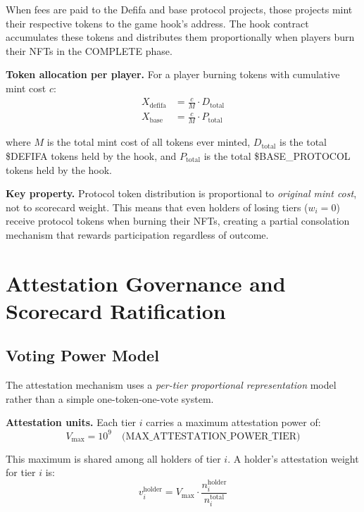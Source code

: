 \documentclass[11pt,a4paper]{article}
\begin{document}
When fees are paid to the Defifa and base protocol projects, those projects mint their respective tokens to the game hook's address. The hook contract accumulates these tokens and distributes them proportionally when players burn their NFTs in the COMPLETE phase.

\textbf{Token allocation per player.} For a player burning tokens with cumulative mint cost $c$:
\begin{align}
X_{\text{defifa}} &= \frac{c}{M} \cdot D_{\text{total}} \\[4pt]
X_{\text{base}} &= \frac{c}{M} \cdot P_{\text{total}}
\end{align}

where $M$ is the total mint cost of all tokens ever minted, $D_{\text{total}}$ is the total \$DEFIFA tokens held by the hook, and $P_{\text{total}}$ is the total \$BASE\_PROTOCOL tokens held by the hook.

\textbf{Key property.} Protocol token distribution is proportional to \emph{original mint cost}, not to scorecard weight. This means that even holders of losing tiers ($w_i = 0$) receive protocol tokens when burning their NFTs, creating a partial consolation mechanism that rewards participation regardless of outcome.

\section{Attestation Governance and Scorecard Ratification}

\subsection{Voting Power Model}

The attestation mechanism uses a \emph{per-tier proportional representation} model rather than a simple one-token-one-vote system.

\textbf{Attestation units.} Each tier $i$ carries a maximum attestation power of:
\begin{equation}
V_{\max} = 10^9 \quad \text{(MAX\_ATTESTATION\_POWER\_TIER)}
\end{equation}

This maximum is shared among all holders of tier $i$. A holder's attestation weight for tier $i$ is:
\begin{equation}
\boxed{v_i^{\text{holder}} = V_{\max} \cdot \frac{n_i^{\text{holder}}}{n_i^{\text{total}}}}
\end{equation}
\end{document}
